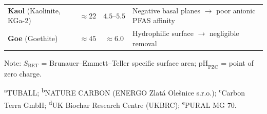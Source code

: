 \documentclass{article}
\begin{document}
\begin{table}[htbp]
{\begin{threeparttable}
\begin{tabular}{>{\raggedright\arraybackslash}p{} c c p{}}
\addlinespace
\textbf{Kaol} (Kaolinite, KGa-2) & $\approx 22$ & $4.5\text{--}5.5$ & Negative basal planes $\rightarrow$ poor anionic PFAS affinity \\
\addlinespace
\textbf{Goe} (Goethite) & $\approx 45$ & $\approx 6.0$ & Hydrophilic surface $\rightarrow$ negligible removal \\
\bottomrule
\end{tabular}
\begin{tablenotes}[flushleft]
\footnotesize
\item Note: $S_{\text{BET}}$ = Brunauer--Emmett--Teller specific surface area; $\text{pH}_{\text{PZC}}$ = point of zero charge.\par
\noindent\textsuperscript{a}TUBALL\texttrademark; \textsuperscript{b}NATURE CARBON (ENERGO Zlat\'{a} Ole\v{s}nice s.r.o.); \textsuperscript{c}Carbon Terra GmbH; \textsuperscript{d}UK Biochar Research Centre (UKBRC); \textsuperscript{e}PURAL MG 70.
\end{tablenotes}
\end{threeparttable}%
}
\end{table}
\end{document}

